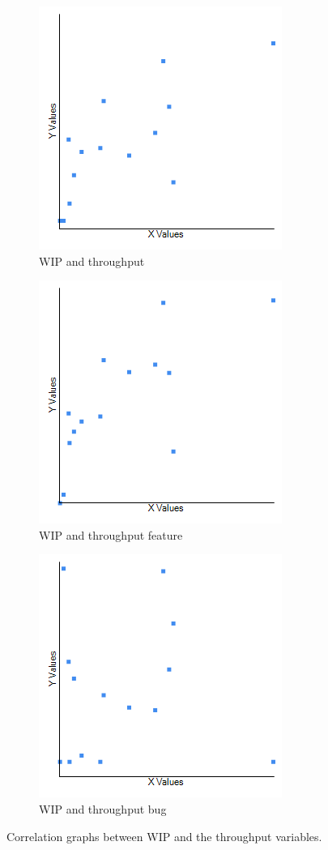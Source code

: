 \documentclass[UKenglish]{ifimaster}  %
\begin{document}
\begin{figure}[h] 
  \begin{subfigure}[b]{0.3\textwidth}
\includegraphics[scale=0.5]{Picture/One/WIPvsTP.png}
 \caption{WIP and throughput} 
 \label{fig:a:1}
  \end{subfigure}
  \begin{subfigure}[b]{0.3\textwidth}
\includegraphics[scale=0.5]{Picture/One/WIPvsTPFT.png}
 \caption{WIP and throughput feature} 
\label{fig:b:1}
  \end{subfigure}
  \begin{subfigure}[b]{0.3\textwidth}
\includegraphics[scale=0.5]{Picture/One/WIPvsTPB.png}
 \caption{WIP and throughput bug} 
\label{fig:c:1}
  \end{subfigure}
\caption{Correlation graphs between WIP and the throughput variables.}
\label{corr:Difference:1}
\end{figure}
\end{document}
